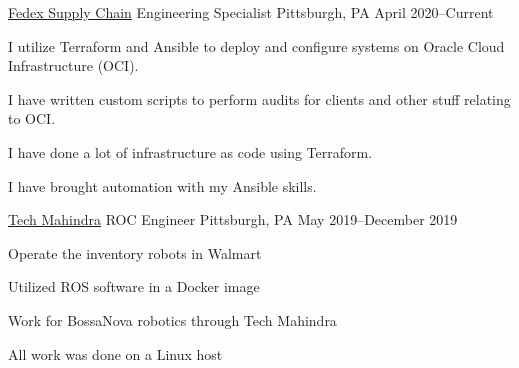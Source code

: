 


\begin{cventries}

\cventry
    {\href{www.fedex.com}{Fedex Supply Chain}}
    {Engineering Specialist}
    {Pittsburgh, PA} {April 2020--Current}
    {
    \begin{cvitems}
    \item I utilize Terraform and Ansible to deploy and configure systems on Oracle Cloud Infrastructure (OCI).
    \item I have written custom scripts to perform audits for clients and other stuff relating to OCI.
    \item I have done a lot of infrastructure as code using Terraform.
    \item I have brought automation with my Ansible skills.
    \end{cvitems}
    }
\cventry
    {\href{www.techmahindra.com}{Tech Mahindra}}
    {ROC Engineer}
    {Pittsburgh, PA} {May 2019--December 2019}
    {
    \begin{cvitems}
    \item Operate the inventory robots in Walmart
    \item Utilized ROS software in a Docker image
    \item Work for BossaNova robotics through Tech Mahindra
    \item All work was done on a Linux host
    \end{cvitems}
    }


\end{cventries}
